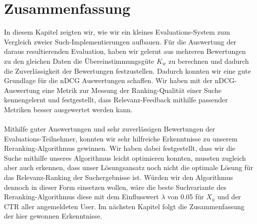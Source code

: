 \section{Zusammenfassung}
\label{sec:Evaluation:Zusammenfassung}

In diesem Kapitel zeigten wir, wie wir ein kleines Evaluations-System zum Vergleich zweier Such-Implementierungen aufbauen. Für die Auswertung der daraus resultierenden Evaluation, haben wir gelernt aus mehreren Bewertungen zu den gleichen Daten die Übereinstimmungsgüte $K_w$ zu berechnen und dadurch die Zuverlässigkeit der Bewertungen festzustellen. Dadurch konnten wir eine gute Grundlage für die nDCG Auswertungen schaffen. Wir haben mit der nDCG-Auswertung eine Metrik zur Messung der Ranking-Qualität einer Suche kennengelernt und festgestellt, dass Relevanz-Feedback mithilfe passender Metriken besser ausgewertet werden kann.
\\
\\
Mithilfe guter Auswertungen und sehr zuverlässigen Bewertungen der Evaluations-Teilnehmer, konnten wir sehr hilfreiche Erkenntnisse zu unserem Reranking-Algorithmus gewinnen. Wir haben dabei festgestellt, dass wir die Suche mithilfe unseres Algorithmus leicht optimieren konnten, mussten zugleich aber auch erkennen, dass unser Lösungsansatz noch nicht die optimale Lösung für das Relevanz-Ranking der Suchergebnisse ist. Würden wir den Algorithmus dennoch in dieser Form einsetzen wollen, wäre die beste Suchvariante des Reranking-Algorithmus diese mit dem Einflusswert $\lambda$ von 0.05 für $X_u$ und der CTR aller angemeldeten User. Im nächsten Kapitel folgt die Zusammenfassung der hier gewonnen Erkenntnisse. 